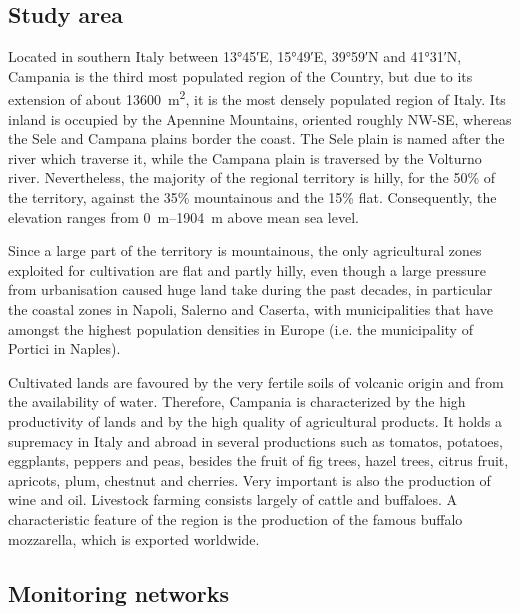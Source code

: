 \documentclass[authoryear,preprint,review,12pt]{elsarticle}
\begin{document}
\subsection{Study area}\label{sec:StudyArea}
Located in southern Italy between \ang{13;45;}E, \ang{15;49;}E, \ang{39;59;}N and \ang{41;31;}N, Campania is the third most populated region of the Country, but due to its extension of about \SI{13600}{\metre\squared}, it is the most densely populated region of Italy.
Its inland is occupied by the Apennine Mountains, oriented roughly NW-SE, whereas the Sele and Campana plains border the coast.
The Sele plain is named after the river which traverse it, while the Campana plain is traversed by the Volturno river.
Nevertheless, the majority of the regional territory is hilly, for the 50\% of the territory, against the 35\% mountainous and the 15\% flat.
Consequently, the elevation ranges from \SIrange{0}{1904}{\metre} above mean sea level.

Since a large part of the territory is mountainous, the only agricultural zones exploited for cultivation are flat and partly hilly, even though a large pressure from urbanisation caused huge land take during the past decades, in particular  the coastal zones in Napoli, Salerno and Caserta, with municipalities that have amongst the highest population densities in Europe (i.e. the municipality of Portici in Naples).

Cultivated lands are favoured by the very fertile soils of volcanic origin and from the availability of water. 
Therefore, Campania is characterized by the high productivity of lands and by the high quality of agricultural products.
It holds a supremacy in Italy and abroad in several productions such as tomatos, potatoes, eggplants, peppers and peas, besides the fruit of fig trees, hazel trees, citrus fruit, apricots, plum, chestnut and cherries.
Very important is also the production of wine and oil.
Livestock farming consists largely of cattle and buffaloes.
A characteristic feature of the region is the production of the famous buffalo mozzarella, which is exported worldwide.


\subsection{Monitoring networks}
\end{document}
